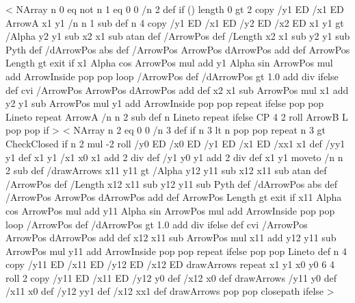 %
\def\psset@ArrowInsideNo#1{\pst@checknum{#1}\psk@ArrowInsideNo}%
\def\psset@ArrowInsideOffset#1{\pst@checknum{#1}\psk@ArrowInsideOffset}%
%
<{%
	NArray n 0 eq not { n 1 eq { 0 0 /n 2 def } if
    (\psk@ArrowInside) length 0 gt {
		2 copy /y1 ED /x1 ED ArrowA x1 y1
    	/n n 1 sub def
    	n {
			4 copy
			/y1 ED /x1 ED /y2 ED /x2 ED
			x1 y1
			\psk@ArrowInsidePos{} gt{
				/Alpha y2 y1 sub x2 x1 sub atan def
				/ArrowPos \psk@ArrowInsideOffset\space def
				/Length x2 x1 sub y2 y1 sub Pyth def
				/dArrowPos \psk@ArrowInsidePos\space abs def
				{
					/ArrowPos ArrowPos dArrowPos add def
					ArrowPos Length gt { exit } if
					x1 Alpha cos ArrowPos mul add
					y1 Alpha sin ArrowPos mul add
					ArrowInside
					pop pop
				} loop
			}{
				/ArrowPos \psk@ArrowInsideOffset\space def
				/dArrowPos  gt {%
					1.0  add div
				}{ \psk@ArrowInsidePos } ifelse def
				\psk@ArrowInsideNo\space cvi {
					/ArrowPos ArrowPos dArrowPos add def
					x2 x1 sub ArrowPos mul x1 add
					y2 y1 sub ArrowPos mul y1 add
					ArrowInside
					pop pop
				} repeat
			} ifelse
			pop pop Lineto
		} repeat
	}{ ArrowA /n n 2 sub def n { Lineto } repeat } ifelse
	CP 4 2 roll ArrowB L pop pop } if%
}>
%
<{%
	NArray n 2 eq { 0 0 /n 3 def } if
	n 3 lt {
		n { pop pop } repeat
	}{
		n 3 gt { CheckClosed } if
		n 2 mul
		-2 roll
		/y0 ED
    	/x0 ED
    	/y1 ED
    	/x1 ED
    	/xx1 x1 def
    	/yy1 y1 def
    	x1 y1
    	/x1 x0 x1 add 2 div def
    	/y1 y0 y1 add 2 div def
    	x1 y1 moveto
    	/n n 2 sub def
		/drawArrows {
			x11 y11
			\psk@ArrowInsidePos{} gt {
				/Alpha y12 y11 sub x12 x11 sub atan def
				/ArrowPos \psk@ArrowInsideOffset\space def
				/Length x12 x11 sub y12 y11 sub Pyth def
				/dArrowPos \psk@ArrowInsidePos\space abs def
				{
					/ArrowPos ArrowPos dArrowPos add def
					ArrowPos Length gt { exit } if
					x11 Alpha cos ArrowPos mul add
					y11 Alpha sin ArrowPos mul add
					ArrowInside
					pop pop
				} loop
			}{
				/ArrowPos \psk@ArrowInsideOffset\space def
				/dArrowPos  gt {%
					1.0  add div
				}{ \psk@ArrowInsidePos } ifelse def
					\psk@ArrowInsideNo cvi {
					/ArrowPos ArrowPos dArrowPos add def
					x12 x11 sub ArrowPos mul x11 add
					y12 y11 sub ArrowPos mul y11 add
        			ArrowInside
					pop pop
				} repeat
			} ifelse
			pop pop Lineto
		} def
		n {
			4 copy
			/y11 ED /x11 ED /y12 ED /x12 ED
			drawArrows
		} repeat
		x1 y1 x0 y0
		6 4 roll
		2 copy
		/y11 ED /x11 ED /y12 y0 def /x12 x0 def
		drawArrows
		/y11 y0 def /x11 x0 def /y12 yy1 def /x12 xx1 def
		drawArrows
		pop pop
    	closepath
	} ifelse %
}>

